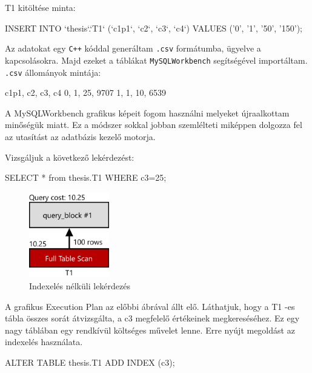 
T1 kitöltése minta:
\begin{python}
INSERT INTO `thesis`.`T1` (`c1p1`, `c2`, `c3`, `c4`)
VALUES ('0', '1', '50', '150');
\end{python}


Az adatokat egy \texttt{C++} kóddal generáltam \texttt{.csv} formátumba, ügyelve a kapcsolásokra. Majd ezeket a táblákat \texttt{MySQLWorkbench} segítségével importáltam. \texttt{.csv} állományok mintája:
\begin{python}
c1p1, c2, c3, c4
0, 1, 25, 9707
1, 1, 10, 6539
\end{python}
\newpage
{}

A MySQLWorkbench grafikus képeit fogom használni melyeket újraalkottam minőségük miatt. Ez a módszer sokkal jobban szemlélteti miképpen dolgozza fel az utasítást az adatbázis kezelő motorja.

Vizsgáljuk a következő lekérdezést:
\begin{python}
SELECT * from thesis.T1 WHERE c3=25; 
\end{python}
\begin{figure}[h!]
\centering
\includegraphics[width=3.5cm]{images/explain/1-1.png}
\caption{Indexelés nélküli lekérdezés}
\label{fig:schema}
\end{figure}

A grafikus Execution Plan az előbbi ábrával állt elő. Láthatjuk, hogy a T1 -es tábla összes sorát átvizsgálta, a c3 megfelelő értékeinek megkereséséhez. Ez egy nagy táblában egy rendkívül költséges művelet lenne. 
Erre nyújt megoldást az indexelés használata.

\begin{python} 
ALTER TABLE  thesis.T1  ADD INDEX (c3);
\end{python}


